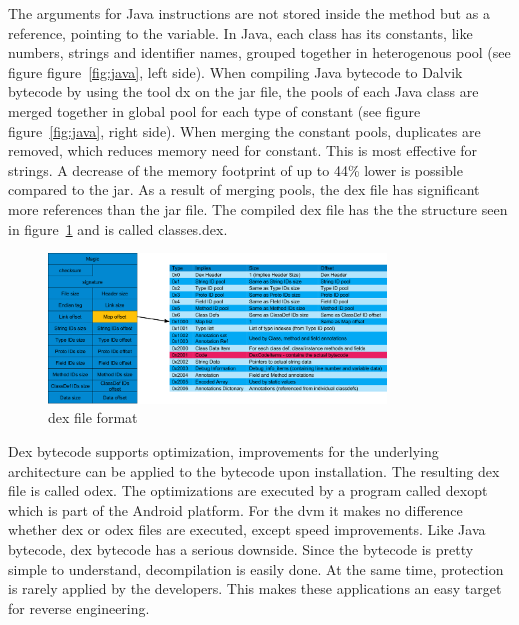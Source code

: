 The arguments for Java instructions are not stored inside the method but as a reference, pointing to the variable.
In Java, each class has its constants, like numbers, strings and identifier names, grouped together in heterogenous pool (see figure figure~\ref{fig:java}, left side).
When compiling Java bytecode to Dalvik bytecode by using the tool dx on the \gls{jar} file,
the pools of each Java class are merged together in global pool for each type of constant (see figure figure~\ref{fig:java}, right side).
When merging the constant pools, duplicates are removed, which reduces memory need for constant.
This is most effective for strings.
A decrease of the memory footprint of up to 44\% lower is possible compared to the \gls{jar}.
As a result of merging pools, the \gls{dex} file has significant more references than the \gls{jar} file.
The compiled \gls{dex} file has the the structure seen in figure~\ref{fig:dex} and is called classes.dex. \cite{ehringerDalvik}
\begin{figure}[h]
    \centering
    \includegraphics[width=0.8\textwidth]{data/dex.png}
    \caption{\gls{dex} file format \cite{andevconDalvikART}}
    \label{fig:dex}
\end{figure}
\newline
\newline
Dex bytecode supports optimization, improvements for the underlying architecture can be applied to the bytecode upon installation.
The resulting \gls{dex} file is called \gls{odex}.
The optimizations are executed by a program called dexopt which is part of the Android platform.
For the \gls{dvm} it makes no difference whether \gls{dex} or \gls{odex} files are executed, except speed improvements.
\newline
Like Java bytecode, \gls{dex} bytecode has a serious downside.
Since the bytecode is pretty simple to understand, decompilation is easily done.
At the same time, protection is rarely applied by the developers.
This makes these applications an easy target for reverse engineering.
